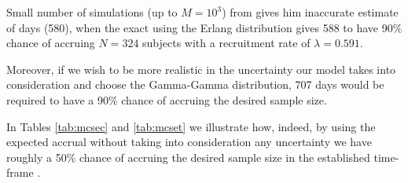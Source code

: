 Small number of simulations (up to $M=10^3$) from \cite{carter2004application} gives him inaccurate estimate of days (580), when the exact using the Erlang distribution gives  588 to have 90\% chance of accruing $N=324$ subjects with a recruitment rate of $\lambda=0.591$.

Moreover, if we wish to be more realistic in the uncertainty our model takes into consideration and choose the Gamma-Gamma distribution, 707 days would be required to have a 90\% chance of accruing the desired sample size. 

In Tables \ref{tab:mcsec} and \ref{tab:mcset} we illustrate how, indeed, by using the expected accrual without taking into consideration any uncertainty we have roughly a 50\% chance of accruing the desired sample size in the established time-frame \citep{carter2004application}.


